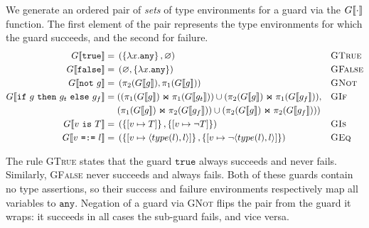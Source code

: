 \documentclass[nonacm,timestamp,manuscript]{acmart}
\newcommand{\atom}[1]{\texttt{#1}}
\newcommand{\singleton}[2]{\langle #1, #2 \rangle} %
\newcommand{\res}[1]{\texttt{#1}}
\begin{document}
\begin{definition}

  We generate an ordered pair of \textit{sets} of type environments for a guard
  via the ${G \llbracket{} \cdot \rrbracket{}}$ function. The first element of the pair represents the
  type environments for which the guard succeeds, and the second for failure.
  \begin{align*}
    \Gden{\res{true}
    } ={}&
           \left(
           \left\{ \lambda x . \atom{any} \right\}
           ,
           \varnothing
           \right)
    && \textsc{GTrue} \\
    \Gden{\res{false}
    } ={}&
           \left(
           \varnothing
           ,
           \left\{ \lambda x . \atom{any} \right\}
           \right)
    && \textsc{GFalse} \\
    \Gden{\res{not}\ g
    } ={}&
           \left(
           \ProjR{\Gden{g}}
           ,
           \ProjL{\Gden{g}}
           \right)
    && \textsc{GNot} \\
    \Gden{\res{if}\ g\ \res{then}\ g_t\ \res{else}\ g_f
    } ={}&
           ( (\JoinG{\ProjL{\Gden{g}}}{\ProjL{\Gden{g_t}}}) \cup (\JoinG{\ProjR{\Gden{g}}}{\ProjL{\Gden{g_f}}}),
    && \textsc{GIf} \\
         & (\JoinG{\ProjL{\Gden{g}}}{\ProjR{\Gden{g_f}}} ) \cup (\JoinG{\ProjR{\Gden{g}}}{\ProjR{\Gden{g_f}}} ) ) \\
    \Gden{v\ \res{is}\ T
    } ={}&
           \left(
           \left\{ \Map{v}{T} \right\}
           ,
           \left\{ \Map{v}{\neg T} \right\}
           \right)
    && \textsc{GIs} \\
    \Gden{v\ \res{=:=}\ l
    } ={}&
           \left(
           \left\{ \Map{v}{\singleton{type(l)}{l}} \right\}
           ,
           \left\{ \Map{v}{\neg \singleton{type(l)}{l}} \right\}
           \right)
    && \textsc{GEq}
  \end{align*}
\end{definition}

The rule \textsc{GTrue} states that the guard $\res{true}$ always succeeds and
never fails. Similarly, \textsc{GFalse} never succeeds and always fails. Both
of these guards contain no type assertions, so their success and failure
environments respectively map all variables to $\atom{any}$. Negation of a
guard via \textsc{GNot} flips the pair from the guard it wraps: it succeeds in
all cases the sub-guard fails, and vice versa.
\end{document}
